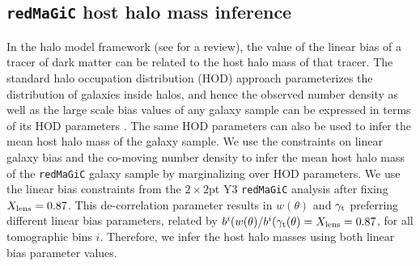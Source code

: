 \documentclass[aps, prd,twocolumn,superscriptaddress,nofootinbib,preprintnumbers]{revtex4-1}
\newcommand{\redmagic}{\texttt{redMaGiC} }
\begin{document}
\subsection{\redmagic host halo mass inference}

In the halo model framework (see \cite{COORAY_2002} for a review), the value of the linear bias of a tracer of dark matter can be related to the host halo mass of that tracer. The standard halo occupation distribution (HOD) approach parameterizes the distribution of  galaxies inside  halos, and hence the observed number density as well as the large scale bias values of any galaxy sample can be expressed in terms of its HOD parameters \citep{Berlind_2002, Zheng_2005, Zehavi_2011}. The same HOD parameters can also be used to infer the mean host halo mass of the galaxy sample. We use the constraints on  linear galaxy bias and the co-moving number density to infer the mean host halo mass of the \redmagic galaxy sample by marginalizing over HOD parameters. We use the linear bias constraints from the $2\times2$pt Y3 \redmagic analysis after fixing $X_{\rm lens}=0.87$. This de-correlation parameter results in $w(\theta)$ and $\gamma_{\rm t}$ preferring different linear bias parameters, related by $b^{i}(w(\theta)/b^{i}(\gamma_{\rm t}(\theta) = X_{\rm lens} = 0.87$, for all tomographic bins $i$. Therefore, we infer the host halo masses using both linear bias parameter values. 
\end{document}

